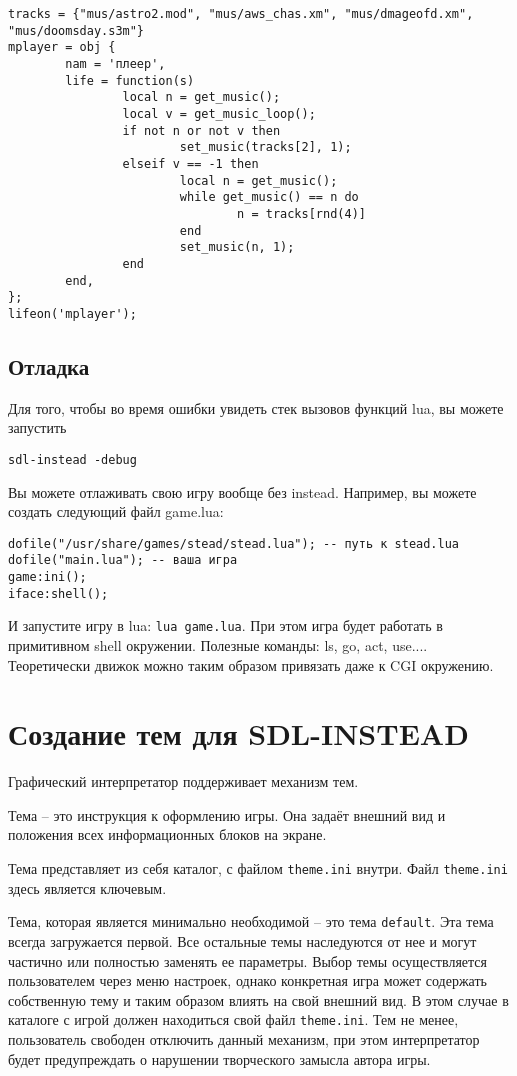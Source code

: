 \documentclass[a4paper,12pt]{article}
\begin{document}
\begin{verbatim}
tracks = {"mus/astro2.mod", "mus/aws_chas.xm", "mus/dmageofd.xm", "mus/doomsday.s3m"}
mplayer = obj {
        nam = 'плеер',
        life = function(s)
                local n = get_music();
                local v = get_music_loop();
                if not n or not v then
                        set_music(tracks[2], 1);
                elseif v == -1 then
                        local n = get_music();
                        while get_music() == n do
                                n = tracks[rnd(4)]
                        end
                        set_music(n, 1);
                end
        end,
};
lifeon('mplayer');
\end{verbatim}

\subsection{Отладка}
Для того, чтобы во время ошибки увидеть стек вызовов функций lua, вы можете запустить 

\begin{verbatim}
sdl-instead -debug
\end{verbatim}

Вы можете отлаживать свою игру вообще без instead. Например, вы можете создать следующий файл game.lua:

\begin{verbatim}
dofile("/usr/share/games/stead/stead.lua"); -- путь к stead.lua
dofile("main.lua"); -- ваша игра
game:ini();
iface:shell();
\end{verbatim}

И запустите игру в lua: \verb/lua game.lua/. При этом игра будет работать в примитивном shell окружении. Полезные команды: ls, go, act, use.... Теоретически движок можно таким образом привязать даже к CGI окружению.

\section{Создание тем для SDL-INSTEAD}

Графический интерпретатор поддерживает механизм тем. 

Тема -- это инструкция к оформлению игры. Она задаёт внешний вид и положения всех информационных блоков на экране.

Тема представляет из себя каталог, с файлом \verb/theme.ini/ внутри. Файл \verb/theme.ini/ здесь является ключевым.

Тема, которая является минимально необходимой -- это тема \verb/default/. Эта тема всегда загружается первой. Все остальные темы наследуются от нее и могут частично или полностью заменять ее параметры. Выбор темы осуществляется пользователем через меню настроек, однако конкретная игра может содержать собственную тему и таким образом влиять на свой внешний вид. В этом случае в каталоге с игрой должен находиться свой файл \verb/theme.ini/. Тем не менее, пользователь свободен отключить данный механизм, при этом интерпретатор будет предупреждать о нарушении творческого замысла автора игры.
\end{document}
